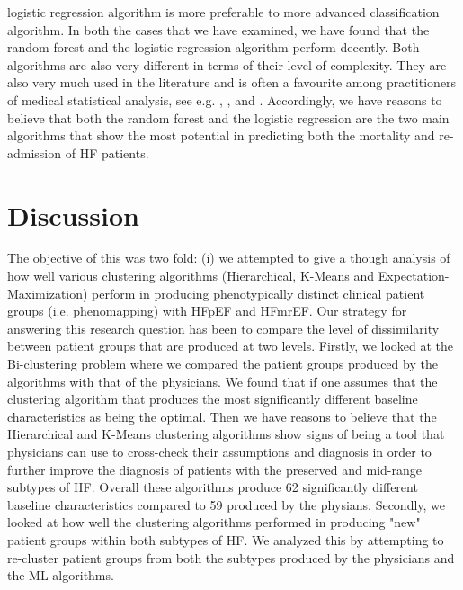 \documentclass[../thesis.tex]{subfiles}
\begin{document}
\vspace*{-0,1cm}

\noindent logistic regression algorithm is more preferable to more advanced classification algorithm. In both the cases that we have examined, we have found that the random forest and the logistic regression algorithm perform decently. Both algorithms are also very different in terms of their level of complexity. They are also very much used in the literature and is often a favourite among practitioners of medical statistical analysis, see e.g. \cite{austin2013using}, \cite{zolfaghar2013big}, \cite{shah2014phenomapping} and \cite{panahiazar2015using}. Accordingly, we have reasons to believe that both the random forest and the logistic regression are the two main algorithms that show the most potential in predicting both the mortality and re-admission of HF patients.

\section{Discussion}

\noindent The objective of this was two fold: (i) we attempted to give a though analysis of how well various clustering algorithms (Hierarchical, K-Means and Expectation-Maximization) perform in producing phenotypically distinct clinical patient groups (i.e. phenomapping) with HFpEF and HFmrEF. Our strategy for answering this research question has been to compare the level of dissimilarity between patient groups that are produced at two levels. Firstly, we looked at the Bi-clustering problem where we compared the patient groups produced by the algorithms with that of the physicians. We found that if one assumes that the clustering algorithm that produces the most significantly different baseline characteristics as being the optimal. Then we have reasons to believe that the Hierarchical and K-Means clustering algorithms show signs of being a tool that physicians can use to cross-check their assumptions and diagnosis in order to further improve the diagnosis of patients with the preserved and mid-range subtypes of HF. Overall these algorithms produce 62 significantly different baseline characteristics compared to 59 produced by the physians. Secondly, we looked at how well the clustering algorithms performed in producing "new" patient groups within both subtypes of HF. We analyzed this by attempting to re-cluster patient groups from both the subtypes produced by the physicians and the ML algorithms. 
\end{document}
